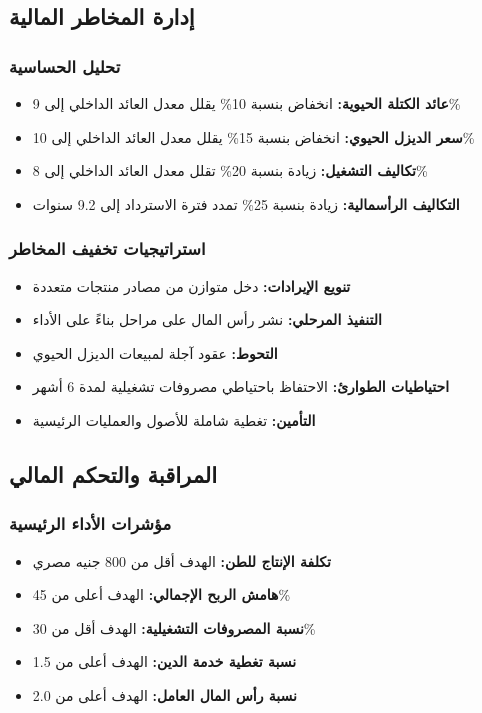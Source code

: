 \subsection{إدارة المخاطر المالية}

\subsubsection{تحليل الحساسية}
\begin{itemize}
    \item \textbf{عائد الكتلة الحيوية:} انخفاض بنسبة 10\% يقلل معدل العائد الداخلي إلى 9\%
    \item \textbf{سعر الديزل الحيوي:} انخفاض بنسبة 15\% يقلل معدل العائد الداخلي إلى 10\%
    \item \textbf{تكاليف التشغيل:} زيادة بنسبة 20\% تقلل معدل العائد الداخلي إلى 8\%
    \item \textbf{التكاليف الرأسمالية:} زيادة بنسبة 25\% تمدد فترة الاسترداد إلى 9.2 سنوات
\end{itemize}

\subsubsection{استراتيجيات تخفيف المخاطر}
\begin{itemize}
    \item \textbf{تنويع الإيرادات:} دخل متوازن من مصادر منتجات متعددة
    \item \textbf{التنفيذ المرحلي:} نشر رأس المال على مراحل بناءً على الأداء
    \item \textbf{التحوط:} عقود آجلة لمبيعات الديزل الحيوي
    \item \textbf{احتياطيات الطوارئ:} الاحتفاظ باحتياطي مصروفات تشغيلية لمدة 6 أشهر
    \item \textbf{التأمين:} تغطية شاملة للأصول والعمليات الرئيسية
\end{itemize}

\subsection{المراقبة والتحكم المالي}

\subsubsection{مؤشرات الأداء الرئيسية}
\begin{itemize}
    \item \textbf{تكلفة الإنتاج للطن:} الهدف أقل من 800 جنيه مصري
    \item \textbf{هامش الربح الإجمالي:} الهدف أعلى من 45\%
    \item \textbf{نسبة المصروفات التشغيلية:} الهدف أقل من 30\%
    \item \textbf{نسبة تغطية خدمة الدين:} الهدف أعلى من 1.5
    \item \textbf{نسبة رأس المال العامل:} الهدف أعلى من 2.0
\end{itemize}

